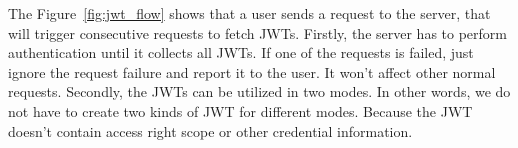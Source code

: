 The Figure~\ref{fig:jwt_flow} shows that a user sends a request to the server, that will trigger consecutive requests to fetch JWTs. Firstly, the server has to perform authentication until it collects all JWTs. If one of the requests is failed, just ignore the request failure and report it to the user. It won't affect other normal requests. Secondly, the JWTs can be utilized in two modes. In other words, we do not have to create two kinds of JWT for different modes. Because the JWT doesn't contain access right scope or other credential information. 
